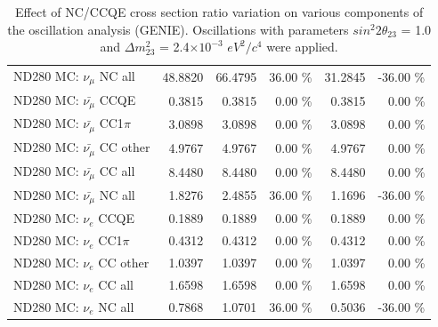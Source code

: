 \begin{table}
\begin{tabular}{| l | r | r  r | r  r |}
                                          ND280 MC: $\nu_{\mu}$ NC all &         48.8820 &         66.4795 & 36.00 \%  &         31.2845 & -36.00 \%  \\ 
                                      ND280 MC: $\bar{\nu_{\mu}}$ CCQE &          0.3815 &          0.3815 &  0.00 \%  &          0.3815 &  0.00 \%  \\ 
                                  ND280 MC: $\bar{\nu_{\mu}}$ CC1$\pi$ &          3.0898 &          3.0898 &  0.00 \%  &          3.0898 &  0.00 \%  \\ 
                                  ND280 MC: $\bar{\nu_{\mu}}$ CC other &          4.9767 &          4.9767 &  0.00 \%  &          4.9767 &  0.00 \%  \\ 
                                    ND280 MC: $\bar{\nu_{\mu}}$ CC all &          8.4480 &          8.4480 &  0.00 \%  &          8.4480 &  0.00 \%  \\ 
                                    ND280 MC: $\bar{\nu_{\mu}}$ NC all &          1.8276 &          2.4855 & 36.00 \%  &          1.1696 & -36.00 \%  \\ 
                                              ND280 MC: $\nu_{e}$ CCQE &          0.1889 &          0.1889 &  0.00 \%  &          0.1889 &  0.00 \%  \\ 
                                          ND280 MC: $\nu_{e}$ CC1$\pi$ &          0.4312 &          0.4312 &  0.00 \%  &          0.4312 &  0.00 \%  \\ 
                                          ND280 MC: $\nu_{e}$ CC other &          1.0397 &          1.0397 &  0.00 \%  &          1.0397 &  0.00 \%  \\ 
                                            ND280 MC: $\nu_{e}$ CC all &          1.6598 &          1.6598 &  0.00 \%  &          1.6598 &  0.00 \%  \\ 
                                            ND280 MC: $\nu_{e}$ NC all &          0.7868 &          1.0701 & 36.00 \%  &          0.5036 & -36.00 \%  \\ 
\hline
\end{tabular}
\caption{ 
  Effect of NC/CCQE cross section ratio variation
  on various components of the oscillation analysis (GENIE).
  Oscillations with parameters $sin^{2}2\theta_{23}$ = 1.0 and $\Delta m^{2}_{23}$ = 2.4$\times10^{-3}$ $eV^{2}/c^{4}$ were applied.  
}
\label{tab:genie_xsec_nc_to_ccqe}
\end{table}


%
%
%
%


